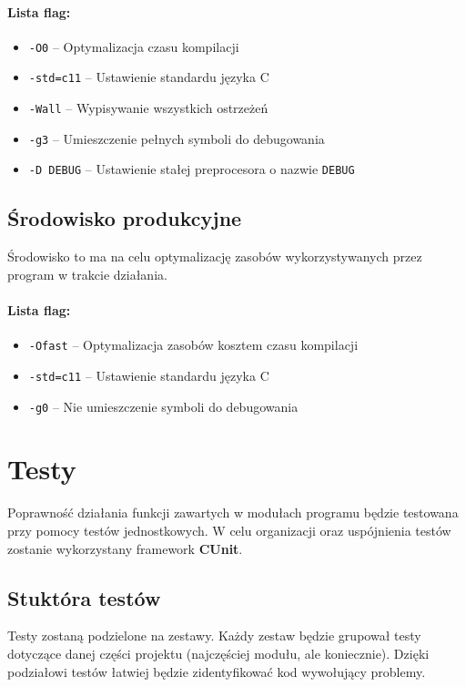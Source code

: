 \documentclass{mwart}
\begin{document}
\paragraph{Lista flag:}
\begin{itemize}
	\item \texttt{-O0} -- Optymalizacja czasu kompilacji
	\item \texttt{-std=c11} -- Ustawienie standardu języka C
	\item \texttt{-Wall} -- Wypisywanie wszystkich ostrzeżeń
	\item \texttt{-g3} -- Umieszczenie pełnych symboli do debugowania
	\item \texttt{-D DEBUG} -- Ustawienie stałej preprocesora o nazwie \texttt{DEBUG}
\end{itemize}

\subsection{Środowisko produkcyjne}
Środowisko to ma na celu optymalizację zasobów wykorzystywanych przez program w trakcie działania.

\paragraph{Lista flag:}
\begin{itemize}
	\item \texttt{-Ofast} -- Optymalizacja zasobów kosztem czasu kompilacji
	\item \texttt{-std=c11} -- Ustawienie standardu języka C
	\item \texttt{-g0} -- Nie umieszczenie symboli do debugowania
\end{itemize}

\section{Testy}
Poprawność działania funkcji zawartych w modułach programu będzie testowana przy pomocy testów jednostkowych. W celu organizacji oraz uspójnienia testów zostanie wykorzystany framework \textbf{CUnit}.

\subsection{Stuktóra testów}
Testy zostaną podzielone na zestawy. Każdy zestaw będzie grupował testy dotyczące danej części projektu (najczęściej modułu, ale koniecznie). Dzięki podziałowi testów łatwiej będzie zidentyfikować kod wywołujący problemy.
\end{document}
